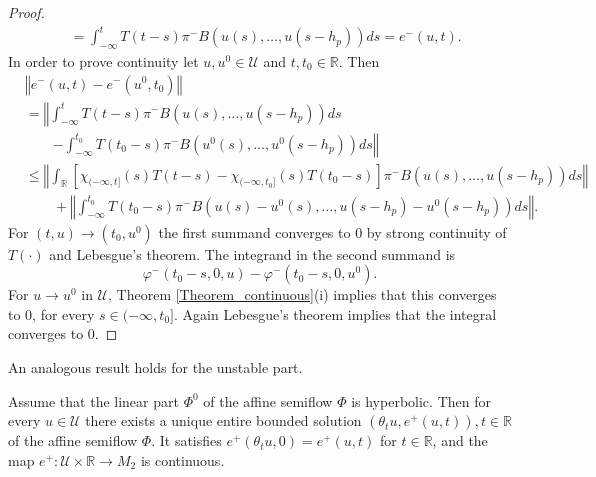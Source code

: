 \documentclass{siamltex}%
\begin{document}
\begin{proof}
\begin{align*}
&  =\int_{-\infty}^{t}T(t-s)\pi^{-}B(u(s),\ldots,u(s-h_{p}))ds=e^{-}(u,t).
\end{align*}
In order to prove continuity let $u,u^{0}\in\mathcal{U}$ and $t,t_{0}%
\in\mathbb{R}$. Then%
\begin{align*}
&  \left\Vert e^{-}(u,t)-e^{-}(u^{0},t_{0})\right\Vert \\
&  =\left\Vert \int_{-\infty}^{t}T(t-s)\pi^{-}B(u(s),\ldots,u(s-h_{p}%
))ds\right. \\
&  \qquad\left.  -\int_{-\infty}^{t_{0}}T(t_{0}-s)\pi^{-}B(u^{0}%
(s),\ldots,u^{0}(s-h_{p}))ds\right\Vert \\
&  \leq\left\Vert \int_{\mathbb{R}}\left[  \chi_{(-\infty,t]}(s)T(t-s)-\chi
_{(-\infty,t_{0}]}(s)T(t_{0}-s)\right]  \pi^{-}B(u(s),\ldots,u(s-h_{p}%
))ds\right\Vert \\
&  \qquad+\left\Vert \int_{-\infty}^{t_{0}}T(t_{0}-s)\pi^{-}B(u(s)-u^{0}%
(s),\ldots,u(s-h_{p})-u^{0}(s-h_{p}))ds\right\Vert .
\end{align*}
For $(t,u)\rightarrow(t_{0},u^{0})$ the first summand converges to $0$ by
strong continuity of $T(\cdot)$ and Lebesgue's theorem. The integrand in the
second summand is%
\[
\varphi^{-}(t_{0}-s,0,u)-\varphi^{-}(t_{0}-s,0,u^{0}).
\]
For $u\rightarrow u^{0}$ in $\mathcal{U}$, Theorem \ref{Theorem_continuous}(i)
implies that this converges to $0$, for every $s\in(-\infty,t_{0}]$. Again
Lebesgue's theorem implies that the integral converges to $0$.
\end{proof}

An analogous result holds for the unstable part.

\begin{lemma}
\label{Lemma7.3}Assume that the linear part $\Phi^{0}$ of the affine semiflow
$\Phi$ is hyperbolic. Then for every $u\in\mathcal{U}$ there exists a unique
entire bounded solution $(\theta_{t}u,e^{+}(u,t)),\allowbreak t\in\mathbb{R}$
of the affine semiflow $\Phi$. It satisfies $e^{+}(\theta_{t}u,0)=e^{+}(u,t)$
for $t\in\mathbb{R}$, and the map $e^{+}:\mathcal{U}\times\mathbb{R}%
\rightarrow M_{2}$ is continuous.
\end{lemma}
\end{document}
